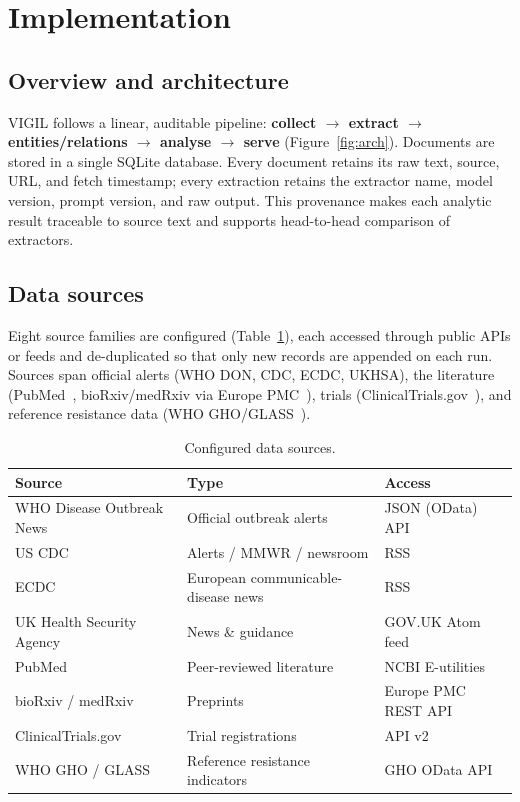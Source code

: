 \documentclass[10pt]{article}
\begin{document}
\section{Implementation}

\subsection{Overview and architecture}
VIGIL follows a linear, auditable pipeline: \textbf{collect $\rightarrow$ extract
$\rightarrow$ entities/relations $\rightarrow$ analyse $\rightarrow$ serve}
(Figure~\ref{fig:arch}). Documents are stored in a single SQLite database. Every
document retains its raw text, source, URL, and fetch timestamp; every extraction
retains the extractor name, model version, prompt version, and raw output. This
provenance makes each analytic result traceable to source text and supports
head-to-head comparison of extractors.

\subsection{Data sources}
Eight source families are configured (Table~\ref{tab:sources}), each accessed
through public APIs or feeds and de-duplicated so that only new records are appended
on each run. Sources span official alerts (WHO DON, CDC, ECDC, UKHSA), the
literature (PubMed~\cite{eutils}, bioRxiv/medRxiv via Europe PMC~\cite{europepmc}),
trials (ClinicalTrials.gov~\cite{ctgov}), and reference resistance data
(WHO GHO/GLASS~\cite{gho,glass}).

\begin{table}[h]
  \centering
  \caption{Configured data sources.}
  \label{tab:sources}
  \small
  \begin{tabular}{lll}
    \toprule
    \textbf{Source} & \textbf{Type} & \textbf{Access} \\
    \midrule
    WHO Disease Outbreak News & Official outbreak alerts & JSON (OData) API \\
    US CDC & Alerts / MMWR / newsroom & RSS \\
    ECDC & European communicable-disease news & RSS \\
    UK Health Security Agency & News \& guidance & GOV.UK Atom feed \\
    PubMed & Peer-reviewed literature & NCBI E-utilities \\
    bioRxiv / medRxiv & Preprints & Europe PMC REST API \\
    ClinicalTrials.gov & Trial registrations & API v2 \\
    WHO GHO / GLASS & Reference resistance indicators & GHO OData API \\
    \bottomrule
  \end{tabular}
\end{table}
\end{document}
